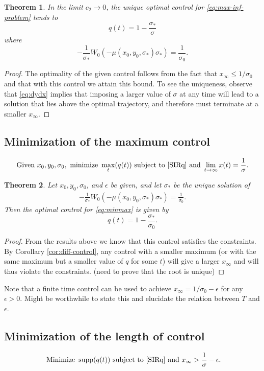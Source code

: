 \documentclass[english,12pt]{article}
\newtheorem{thm}{Theorem}
\newcommand{\Rnot}{\sigma_0}
\newcommand{\Sinf}{x_\infty}
\DeclareMathOperator\supp{supp}
\begin{document}
\begin{thm}
In the limit $c_2 \to 0$, the unique optimal control for \eqref{eq:max-inf-problem} tends to
$$
    q(t) = 1-\frac{\sigma_*}{\sigma}
$$
where
$$
    -\frac{1}{\sigma_*} W_0(-\mu(x_0,y_0,\sigma_*)\sigma_*) = \frac{1}{\sigma_0}.
$$
\end{thm}
\begin{proof}
    The optimality of the given control follows from the fact that $\Sinf \le 1/\Rnot$ and
    that with this control we attain this bound.  To see the uniqueness, observe that
    \eqref{eq:dydx} implies that imposing a larger value of $\sigma$ at any time will lead
    to a solution that lies above the optimal trajectory, and therefore must terminate at
    a smaller $\Sinf$.
\end{proof}

\subsection{Minimization of the maximum control}
\begin{align} \label{eq:minmax}
\text{Given } x_0, y_0, \sigma_0, \text{ minimize } \max_t(q(t)) \text{ subject to } \eqref{SIRq} \text{ and } \lim_{t\to\infty} x(t) = \frac{1}{\sigma}.
\end{align}
\begin{thm}
Let $x_0, y_0, \sigma_0$, and $\epsilon$ be given, and let $\sigma_*$ be the unique solution of
\begin{align*}
    -\frac{1}{\sigma_*} W_0(-\mu(x_0,y_0,\sigma_*)\sigma_*) = \frac{1}{\sigma_0}.
\end{align*}
Then the optimal control for \eqref{eq:minmax} is given by 
$$
    q(t) = 1 - \frac{\sigma_*}{\sigma_0}.
$$
\end{thm}
\begin{proof}
    From the results above we know that this control satisfies the constraints.
    By Corollary \ref{cor:diff-control}, any control with a smaller maximum (or
    with the same maximum but a smaller value of $q$ for some $t$) will give 
    a larger $x_\infty$ and will thus violate the constraints.
    (need to prove that the root is unique)
\end{proof}
Note that a finite time control can be used to achieve $x_\infty=1/\sigma_0 - \epsilon$ for
any $\epsilon>0$.  Might be worthwhile to state this and elucidate the relation between
$T$ and $\epsilon$.


\subsection{Minimization of the length of control}
\begin{align} \label{eq:minsupp}
\text{ Minimize } \supp(q(t)) \text{ subject to } \eqref{SIRq} \text{ and } x_\infty > \frac{1}{\sigma} - \epsilon.
\end{align}
\end{document}

